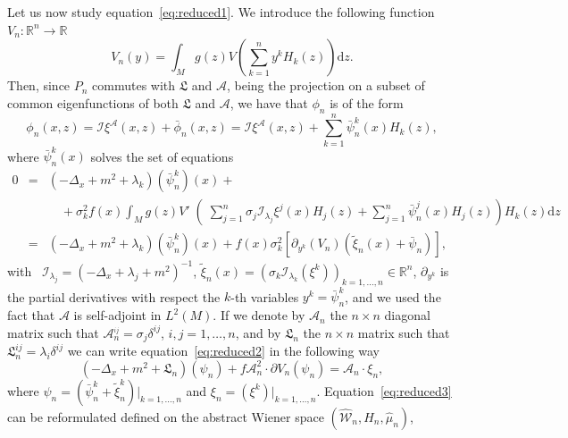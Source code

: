 \documentclass[a4paper,10pt]{article}
\newcommand{\mathd}{\mathrm{d}}
\newcommand{\nobracket}{}
\begin{document}
Let us now study equation~{\eqref{eq:reduced1}}. We introduce the following
function $V_n : \mathbb{R}^n \rightarrow \mathbb{R}$
\[ V_n (y) = \int_M g (z) V \left( \sum_{k = 1}^n y^k H_k (z) \right) \mathd
   z. \]
Then, since $P_n$ commutes with $\mathfrak{L}$ and $\mathcal{A}$, being the
projection on a subset of common eigenfunctions of both $\mathfrak{L}$ and
$\mathcal{A}$, we have that $\phi_n$ is of the form
\[ \phi_n (x, z) = \mathcal{I} \xi^{\mathcal{A}} (x, z) +
   \bar{\phi}_n (x, z) = \mathcal{I} \xi^{\mathcal{A}} (x, z) + \sum_{k = 1}^n
   \bar{\psi}_n^k (x) H_k (z), \]
where $\bar{\psi}^k_n (x)$ solves the set of equations
\begin{equation}
  \begin{array}{lll}
    0 & = & (- \Delta_x + m^2 + \lambda_k) (\bar{\psi}^k_n) (x) +\\
    &  & \quad + \sigma_k^2 f (x) \int_M g (z) \left. V' \middle( \sum_{j =
    1}^n \sigma_j \mathcal{I}_{\lambda_j} \xi^j (x) H_j (z) + \left. \sum_{j =
    1}^n \bar{\psi}^j_n (x)  H_j (z) \right) H_k (z) \mathd z
    \right.\\
    & = & (- \Delta_x + m^2 + \lambda_k) (\bar{\psi}^k_n) (x) + f (x)
    \sigma_k^2 [\partial_{y^k} (V_n) (\tilde{\xi}_n (x) + \bar{\psi}_n)],
  \end{array} \label{eq:reduced2}
\end{equation}
with \ $\mathcal{I}_{\lambda_j} = (- \Delta_x + \lambda_j + m^2)^{- 1}$,
$\tilde{\xi}_n (x) = (\sigma_k \mathcal{I}_{\lambda_k} (\xi^k))_{k = 1,
\ldots, n} \in \mathbb{R}^n$, $\partial_{y^k}$ is the partial derivatives with
respect the $k$-th variables $y^k = \bar{\psi}^k_n$, and we used the fact that
$\mathcal{A}$ is self-adjoint in $L^2 (M)$. If we denote by $\mathcal{A}_n$
the $n \times n$ diagonal matrix such that $\mathcal{A}^{_{i j}}_n = \sigma_j
\delta^{i j}$, $i, j = 1, \ldots, n$, and by $\mathfrak{L}_n$ the $n \times n$
matrix such that $\mathfrak{L}_n^{i j} = \lambda_i \delta^{i j}$ we can write
equation~{\eqref{eq:reduced2}} in the following way
\begin{equation}
  (- \Delta_x + m^2 + \mathfrak{L}_n) (\psi_n) + f \mathcal{A}^2_n \cdot
  \partial V_n (\psi_n) = \mathcal{A}_n \cdot \xi_n, \label{eq:reduced3}
\end{equation}
where $\nobracket \psi_n = (\bar{\psi}_n^k + \tilde{\xi}_n^k) |_{k = 1,
\ldots, n} \nobracket$ and $\nobracket \xi_n = (\xi^k) |_{k = 1, \ldots, n}
\nobracket$. Equation~{\eqref{eq:reduced3}} can be reformulated defined on the
abstract Wiener space $(\widehat{\mathcal{W}}_n, \widehat{H}_n, \hat{\mu}_n)$,
\end{document}
